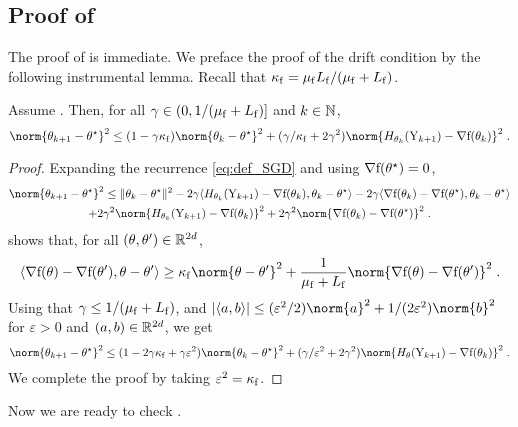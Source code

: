 \subsection{Proof of }
\label{sec:proof_drift_sgd}
The proof of  is immediate. We preface the proof of the drift condition  by the following instrumental lemma. Recall that $\kappa_{\mathrm{f}}= \mu_{\mathrm{f}} L_{\mathrm{f}}/ (\mu_{\mathrm{f}}+L_{\mathrm{f}})$.
\begin{lemma}
\label{lem:descent-SGD}
Assume . Then, for all $\gamma \in \left(0,1/(\mu_{\mathrm{f}}+L_{\mathrm{f}})\right]$ and $k \in \mathbb{N}$,
\begin{equation*}
\norm{\theta_{k+1} - \thetas}^2 \leq (1 - \gamma \kapf) \norm{\theta_k - \thetas}^2
+ (\gamma / \kapf + 2 \gamma^2) \norm{\fieldH_{\theta_k}(\YSGD_{k+1}) - \nabla \objf(\theta_k)}^2 \eqsp.
\end{equation*}
\end{lemma}
\begin{proof}
Expanding the recurrence \eqref{eq:def_SGD} and using $\nabla \mathrm{f}(\theta^{\star}) = 0$,
\begin{multline*}
\norm{\theta_{k+1}- \thetas}^2 \leq \| \theta_k - \thetas \|^2 - 2 \gamma \ps{\fieldH_{\theta_k}(\YSGD_{k+1}) - \nabla \objf(\theta_k)}{\theta_k - \thetas} - 2 \gamma \ps{\nabla \objf(\theta_k) - \nabla \objf(\thetas)}{\theta_k - \thetas} \\
+ 2 \gamma^2 \norm{\fieldH_{\theta_k}(\YSGD_{k+1}) - \nabla \objf(\theta_k)}^2 + 2 \gamma^2 \norm{\nabla \objf(\theta_k) - \nabla \objf(\thetas)}^2 \eqsp.
\end{multline*}
\cite[Theorem~2.1.12]{nesterov:2004} shows that, for all $(\theta,\theta') \in \mathbb{R}^{2d}$,
\[
\ps{\nabla \objf(\theta)-\nabla \objf(\theta')}{\theta-\theta'} \geq \kapf \norm{\theta-\theta'}^{2}+\frac{1}{\muf+\Lf}\norm{\nabla \objf(\theta)-\nabla \objf(\theta')}^{2} \eqsp.
\]
Using that $\gamma \leq 1/(\mu_{\mathrm{f}}+L_{\mathrm{f}})$, and $|\ps{a}{b}| \leq (\varepsilon^2/2) \norm{a}^2 + 1/(2 \varepsilon^2) \norm{b}^2$ for $\varepsilon >0$ and $(a,b) \in \mathbb{R}^{2d}$, we get
\[
\norm{\theta_{k+1}-\thetas}^2 \leq ( 1 - 2 \gamma \kapf + \gamma \varepsilon^2)
\norm{\theta_k - \thetas}^2 + (\gamma/ \varepsilon^2 + 2 \gamma^2) \norm{\fieldH_\theta(\YSGD_{k+1}) - \nabla \objf(\theta_k)}^2 \eqsp.
\]
We complete the proof by taking $\varepsilon^2 = \kappa_{\mathrm{f}}$.
\end{proof}
Now we are ready to check .

